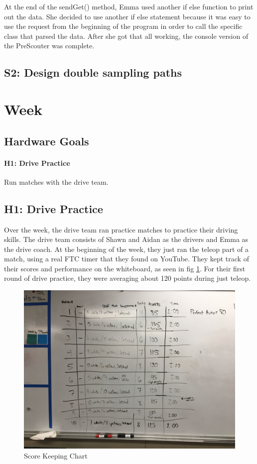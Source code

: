 \documentclass{article}
\begin{document}
At the end of the sendGet() method, Emma used another if else function to print out the data. She decided to use another if else statement because it was easy to use the request from the beginning of the program in order to call the specific class that parsed the data. After she got that all working, the console version of the PreScouter was complete. \\


\subsection{S2: Design double sampling paths}

\clearpage \newpage \section{Week \thesection} 
\subsection{Hardware Goals}
\paragraph{H1: Drive Practice}
 Run matches with the drive team. 
\newpage
\subsection{H1: Drive Practice}

Over the week, the drive team ran practice matches to practice their driving skills. The drive team consists of Shawn and Aidan as the drivers and Emma as the drive coach. At the beginning of the week, they just ran the teleop part of a match, using a real FTC timer that they found on YouTube. They kept track of their scores and performance on the whiteboard, as seen in fig \ref{fig:chart}. For their first round of drive practice, they were averaging about 120 points during just teleop. 

\begin{figure}
    \centering
    \includegraphics[width=.6 \textwidth]{23_02-04/images/IMG_1512.JPG}
    \caption{Score Keeping Chart}
    \label{fig:chart}
\end{figure}
\end{document}
